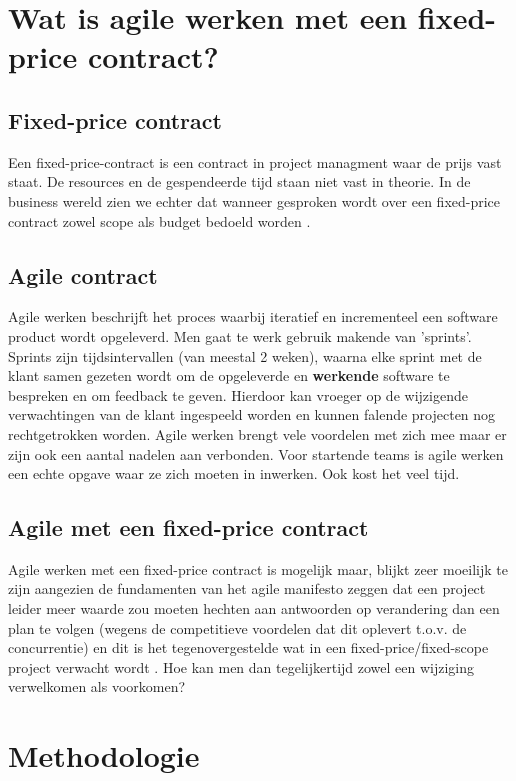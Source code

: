 \documentclass{hogent-article}
\begin{document}
    \section{Wat is agile werken met een fixed-price contract?}
    \subsection{Fixed-price contract}
     Een fixed-price-contract is een contract in project managment waar de prijs vast staat. De resources en de gespendeerde tijd staan niet vast \autocite{PMK} in theorie. In de business wereld zien we echter dat wanneer gesproken wordt over een fixed-price contract zowel scope als budget bedoeld worden \autocite{PMI2011}.
     \subsection{Agile contract}
     Agile werken beschrijft het proces waarbij iteratief en incrementeel een software product wordt opgeleverd. Men gaat te werk gebruik makende van 'sprints'. Sprints zijn tijdsintervallen (van meestal 2 weken), waarna elke sprint met de klant samen gezeten wordt om de opgeleverde en \textbf{werkende} software te bespreken en om feedback te geven. Hierdoor kan vroeger op de wijzigende verwachtingen van de klant ingespeeld worden en kunnen falende projecten nog rechtgetrokken worden. Agile werken brengt vele voordelen met zich mee maar er zijn ook een aantal nadelen aan verbonden. Voor startende teams is agile werken een echte opgave waar ze zich moeten in inwerken. Ook kost het veel tijd.
    
    \subsection{Agile met een fixed-price contract}
    Agile werken met een fixed-price contract is mogelijk maar, blijkt zeer moeilijk te zijn aangezien de fundamenten van het agile manifesto zeggen dat een project leider meer waarde zou moeten hechten aan antwoorden op verandering dan een plan te volgen (wegens de competitieve voordelen dat dit oplevert t.o.v. de concurrentie) en dit is het tegenovergestelde wat in een fixed-price/fixed-scope project verwacht wordt \autocite{PMI2011}. Hoe kan men dan tegelijkertijd zowel een wijziging verwelkomen als voorkomen?
	\section{Methodologie}
\end{document}
